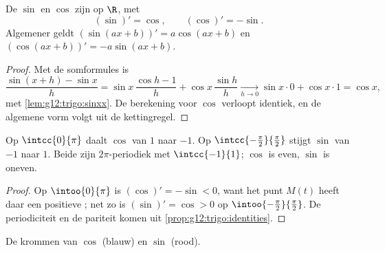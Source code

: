 \begin{theorem}\label{thm:g12:trigo:derivatives}
De  $\sin$ en $\cos$ zijn  op $\R$, met
\[
(\sin)' = \cos, \qquad (\cos)' = -\sin .
\]
Algemener geldt $(\sin(ax+b))' = a\cos(ax+b)$ en
$(\cos(ax+b))' = -a\sin(ax+b)$.
\end{theorem}

\begin{proof}
Met de somformules is
\[
\frac{\sin(x+h) - \sin x}{h}
= \sin x\,\frac{\cos h - 1}{h} + \cos x\,\frac{\sin h}{h}
\xrightarrow[h\to0]{} \sin x \cdot 0 + \cos x \cdot 1 = \cos x,
\]
met \cref{lem:g12:trigo:sinxx}. De berekening voor $\cos$ verloopt identiek,
en de algemene vorm volgt uit de kettingregel.
\end{proof}

\begin{proposition}[Verloop]\label{prop:g12:trigo:variations}
Op $\intcc{0}{\pi}$ daalt $\cos$ van $1$ naar $-1$. Op
$\intcc{-\frac\pi2}{\frac\pi2}$ stijgt $\sin$ van $-1$ naar $1$. Beide
 zijn $2\pi$-periodiek met  $\intcc{-1}{1}$; $\cos$ is even,
$\sin$ is oneven.
\end{proposition}

\begin{proof}
Op $\intoo{0}{\pi}$ is $(\cos)' = -\sin < 0$, want het punt $M(t)$ heeft daar
een positieve ; net zo is $(\sin)' = \cos > 0$ op
$\intoo{-\frac\pi2}{\frac\pi2}$. De periodiciteit en de pariteit komen uit
\cref{prop:g12:trigo:identities}.
\end{proof}

\begin{omfigure}

{\small De krommen van $\cos$ (blauw) en $\sin$ (rood).}
\end{omfigure}

